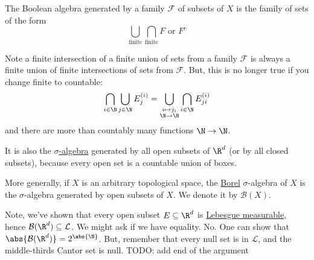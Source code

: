 \documentclass{article}
\newcommand{\1}[1]{\mathbbm{1}_{#1}}
\begin{document}
\begin{remark}
    The Boolean algebra generated by a family $\mathcal{F}$ of subsets of $X$ is the family of sets of the form
    \begin{equation*}
        \bigcup_{\text{finite}} \bigcap_{\text{finite}} F \text{ or } F^c
    \end{equation*}
\end{remark}

Note a finite intersection of a finite union of sets from a family $\mathcal{F}$ is always a finite union of finite intersections of sets from $\mathcal{F}$. But, this is no longer true if you change finite to countable:
\begin{equation*}
    \bigcap_{i \in \N} \bigcup_{j \in \N} E_j^{(i)} = \bigcup_{\substack{i \mapsto j_i \\ \N \to \N}} \bigcap_{i \in \N} E_{ji}^{(i)}
\end{equation*}
and there are more than countably many functions $\N \to \N$.


\begin{remark}
    It is also the \hyperlink{def:sigAlg}{$\sigma$-algebra} generated by all open subsets of $\R^d$ (or by all closed subsets), because every open set is a countable union of boxes.

    More generally, if $X$ is an arbitrary topological space, the \hyperlink{def:borelAlg}{Borel} $\sigma$-algebra of $X$ is the $\sigma$-algebra generated by open subsets of $X$. We denote it by $\mathcal{B}(X)$.
\end{remark}

Note, we've shown that every open subset $E \subseteq \R^d$ is \hyperlink{def:lebMAble}{Lebesgue measurable}, hence $\mathcal{B}(\R^d) \subseteq \mathcal{L}$. We might ask if we have equality.
No. One can show that $\abs{\mathcal{B}(\R^d)} = 2^{\abs{\N}}$. But, remember that every null set is in $\mathcal{L}$, and the middle-thirds Cantor set is null.
TODO: add end of the argument


\end{document}
